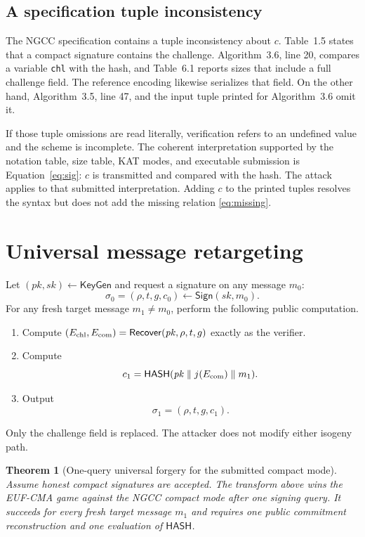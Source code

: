 \documentclass[11pt,a4paper]{article}
\newtheorem{theorem}{Theorem}
\newcommand{\Hash}{\mathsf{HASH}}
\newcommand{\Rec}{\mathsf{Recover}}
\newcommand{\Sign}{\mathsf{Sign}}
\newcommand{\KeyGen}{\mathsf{KeyGen}}
\begin{document}
\subsection{A specification tuple inconsistency}
\label{sec:tuple}

The NGCC specification contains a tuple inconsistency about $c$.  Table~1.5 states that a
compact signature contains the challenge.  Algorithm~3.6, line 20, compares a variable
\texttt{chl} with the hash, and Table~6.1 reports sizes that include a full challenge field.
The reference encoding likewise serializes that field.  On the other hand, Algorithm~3.5,
line 47, and the input tuple printed for Algorithm~3.6 omit it.

If those tuple omissions are read literally, verification refers to an undefined value and the
scheme is incomplete.  The coherent interpretation supported by the notation table, size table,
KAT modes, and executable submission is Equation~\eqref{eq:sig}: $c$ is transmitted and
compared with the hash.  The attack applies to that submitted interpretation.  Adding $c$ to the
printed tuples resolves the syntax but does not add the missing relation
\eqref{eq:missing}.

\section{Universal message retargeting}
\label{sec:attack}

Let $(\mathit{pk},\mathit{sk})\leftarrow\KeyGen$ and request a signature on any message
$m_0$:
\[
  \sigma_0=(\rho,t,g,c_0)\leftarrow\Sign(\mathit{sk},m_0).
\]
For any fresh target message $m_1\ne m_0$, perform the following public computation.
\begin{enumerate}[leftmargin=1.7em]
  \item Compute $(E_{\rm chl},E_{\rm com})=\Rec(\mathit{pk},\rho,t,g)$ exactly as the verifier.
  \item Compute
        \[
          c_1=\Hash(\mathit{pk}\parallel j(E_{\rm com})\parallel m_1).
        \]
  \item Output
        \[
          \sigma_1=(\rho,t,g,c_1).
        \]
\end{enumerate}
Only the challenge field is replaced.  The attacker does not modify either isogeny path.

\begin{theorem}[One-query universal forgery for the submitted compact mode]
Assume honest compact signatures are accepted.  The transform above wins the EUF-CMA game
against the NGCC compact mode after one signing query.  It succeeds for every fresh target
message $m_1$ and requires one public commitment reconstruction and one evaluation of $\Hash$.
\end{theorem}
\end{document}
